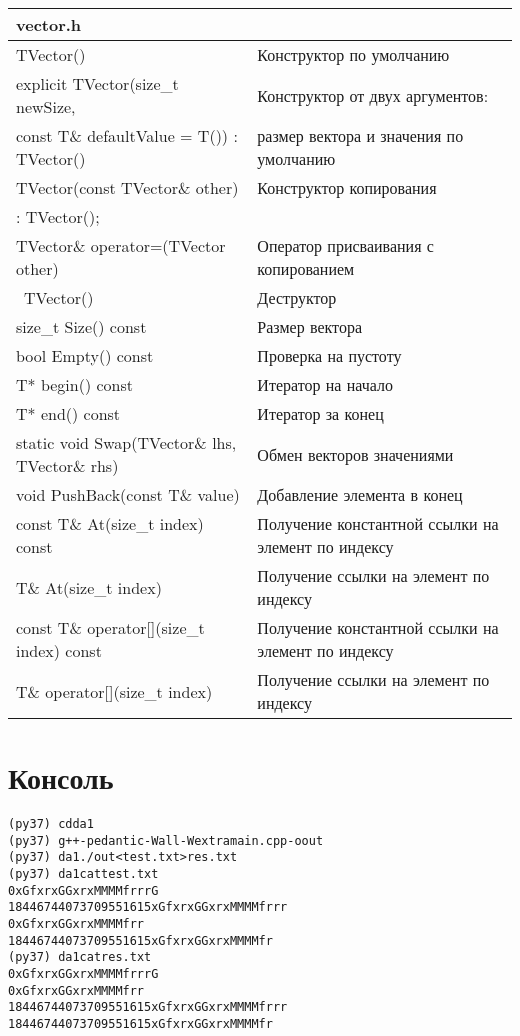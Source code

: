 \begin{longtable}{|p{7.5cm}|p{7.5cm}|}
\hline
\rowcolor{lightgray}
\multicolumn{2}{|c|} {vector.h}\\\hline
TVector()&Конструктор по умолчанию\\\hline
explicit TVector(size\_t newSize,&Конструктор от двух аргументов:\\ 
const T\& defaultValue = T()) : TVector()&размер вектора и значения по умолчанию\\\hline
TVector(const TVector\& other)&Конструктор копирования\\ 
: TVector();&\\\hline
TVector\& operator=(TVector other)&Оператор присваивания с копированием\\\hline
~TVector()&Деструктор\\\hline
size\_t Size() const&Размер вектора\\\hline
bool Empty() const&Проверка на пустоту\\\hline
T* begin() const&Итератор на начало\\\hline
T* end() const&Итератор за конец\\\hline
static void Swap(TVector\& lhs, TVector\& rhs)&Обмен векторов значениями\\\hline
void PushBack(const T\& value)&Добавление элемента в конец\\\hline
const T\& At(size\_t index) const&Получение константной ссылки на элемент по индексу\\\hline
T\& At(size\_t index)&Получение ссылки на элемент по индексу\\\hline
const T\& operator[](size\_t index) const&Получение константной ссылки на элемент по индексу\\\hline
T\& operator[](size\_t index)&Получение ссылки на элемент по индексу\\\hline
\end{longtable}

\pagebreak

\section{Консоль}

\begin{alltt}
(py37) ~ cd da1                    
(py37) ~ g++ -pedantic -Wall -Wextra main.cpp -o out      
(py37) ~ da1 ./out <test.txt >res.txt  
(py37) ~ da1 cat test.txt              
0 xGfxrxGGxrxMMMMfrrrG
18446744073709551615  xGfxrxGGxrxMMMMfrrr
0 xGfxrxGGxrxMMMMfrr
18446744073709551615  xGfxrxGGxrxMMMMfr
(py37) ~ da1 cat res.txt               
0 xGfxrxGGxrxMMMMfrrrG
0 xGfxrxGGxrxMMMMfrr
18446744073709551615 xGfxrxGGxrxMMMMfrrr
18446744073709551615 xGfxrxGGxrxMMMMfr
\end{alltt}

\pagebreak

